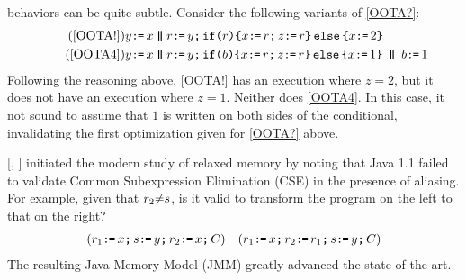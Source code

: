 \oota{} behaviors can be quite subtle.
Consider the following variants of \eqref{OOTA?}:
\begin{align}
  \tag{\ref{OOTA!}}
    y\GETS x
  \PAR&
  r\GETS y\SEMI \IF{r}\THEN 
  x\GETS r\SEMI z\GETS r \ELSE x\GETS2 \FI
  \\
  \tag{\ref{OOTA4}}
  y\GETS x
  \PAR&
  r\GETS y \SEMI \IF{b}\THEN  x\GETS r \SEMI z\GETS r \ELSE x\GETS1 \FI
  \PAR
  b\GETS1
\end{align}
Following the reasoning above, \eqref{OOTA!} has an execution where
$z{=}2$, but it does not have an execution where $z{=}1$.   Neither does
\ref{OOTA4}.  In this case, it not sound to assume that  $1$ is
written on both sides of the conditional, invalidating the first optimization
given for \eqref{OOTA?} above.
  




\citeauthor{DBLP:conf/java/Pugh99} [\citeyear{DBLP:conf/java/Pugh99},
] initiated the modern study of relaxed memory by noting that
Java 1.1 failed to validate Common Subexpression Elimination (CSE) in the
presence of aliasing. For example, given that $r_2{\neq}s$, is it valid
to transform the program on the left to that on the right?
\begin{align*}
  ({r_1\texttt{:}\mkern-1mu\texttt{=}\, x \texttt{;}\,\allowbreak
  s\texttt{:}\mkern-1mu\texttt{=}\, y \texttt{;}\,\allowbreak  
  r_2\texttt{:}\mkern-1mu\texttt{=}\, x\texttt{;}\,\allowbreak C})
&&
  ({r_1\texttt{:}\mkern-1mu\texttt{=}\, x \texttt{;}\,\allowbreak     
    r_2\texttt{:}\mkern-1mu\texttt{=}\, r_1\texttt{;}\,\allowbreak
    s\texttt{:}\mkern-1mu\texttt{=}\, y \texttt{;}\,\allowbreak C})
\end{align*}
The resulting Java Memory Model (JMM) \cite{Manson:2005:JMM:1047659.1040336}
greatly advanced the state of the art.


